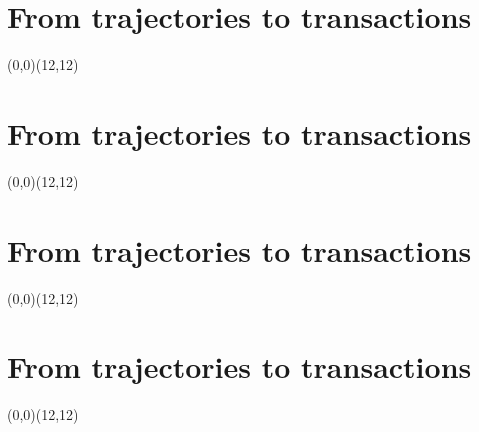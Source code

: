 \section*{From trajectories to transactions}
\begin{center}
	\vspace{1cm}
	 {
		\begin{pspicture}(0,0)(12,12)
			
		\end{pspicture}
	}
\end{center}
	

\section*{From trajectories to transactions}
\begin{center}
	\vspace{1cm}
	 {
		\begin{pspicture}(0,0)(12,12)
			
		\end{pspicture}
	}
\end{center}

\clearpage
\section*{From trajectories to transactions}
\begin{center}
	\vspace{1cm}
	 {
		\begin{pspicture}(0,0)(12,12)
			
			
		\end{pspicture}
	}
\end{center}
\clearpage
\section*{From trajectories to transactions}
\begin{center}
	\vspace{1cm}
	 {
		\begin{pspicture}(0,0)(12,12)
			
			
			
		\end{pspicture}
	}
\end{center}
\clearpage
